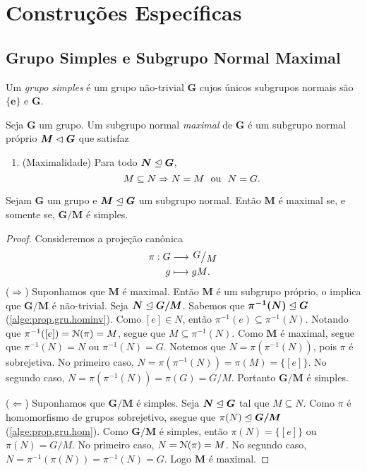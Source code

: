 \cleardoublepage
\section{Construções Específicas}

\subsection{Grupo Simples e Subgrupo Normal Maximal}

\begin{defi}
Um \emph{grupo simples} é um grupo não-trivial $\bm G$ cujos únicos subgrupos normais são $\bm{\{e\}}$ e $\bm G$.
\end{defi}

\begin{defi}
Seja $\bm G$ um grupo. Um subgrupo normal \emph{maximal} de $\bm G$ é um subgrupo normal próprio $\bm M \mathrel{\lhd} \bm G$ que satisfaz
	\begin{enumerate}
	\item (Maximalidade) Para todo $\bm N \mathrel{\unlhd} \bm G$,
		\begin{equation*}
		M \subseteq N \Rightarrow N = M \text{\ \ ou\ \ } N = G.
		\end{equation*}
	\end{enumerate}
\end{defi}

\begin{prop}
Sejam $\bm G$ um grupo e $\bm M \mathrel{\unlhd} \bm G$ um subgrupo normal. Então $\bm M$ é maximal se, e somente se, $\bm{G/M}$ é simples.
\end{prop}
\begin{proof} Consideremos a projeção canônica
	\begin{align*}
	\func{\pi}{G}{\quo{G}{M}}{g}{gM}.
	\end{align*}
($\Rightarrow$) Suponhamos que $\bm M$ é maximal. Então $\bm M$ é um subgrupo próprio, o implica que $\bm{G/M}$ é não-trivial. Seja $\bm N \mathrel{\unlhd} \bm{G/M}$. Sabemos que $\bm{\pi^{-1}(N)} \mathrel{\unlhd} \bm G$ (\ref{alge:prop.gru.hominv}). Como $[e] \in N$, então $\pi^{-1}(e) \subseteq \pi^{-1}(N)$. Notando que $\pi^{-1}([e])=\mathcal{N}(\pi) = M$, segue que $M \subseteq \pi^{-1}(N)$. Como $\bm M$ é maximal, segue que $\pi^{-1}(N) = N$ ou $\pi^{-1}(N) = G$. Notemos que $N=\pi(\pi^{-1}(N))$, pois $\pi$ é sobrejetiva. No primeiro caso, $N = \pi(\pi^{-1}(N)) = \pi(M) = \{[e]\}$. No segundo caso, $N = \pi(\pi^{-1}(N)) = \pi(G) = G/M$. Portanto $\bm{G/M}$ é simples.

\noindent
($\Leftarrow$) Suponhamos que $\bm{G/M}$ é simples. Seja $\bm N \mathrel{\unlhd} \bm G$ tal que $M \subseteq N$. Como $\pi$ é homomorfismo de grupos sobrejetivo, ssegue que $\pi(N) \mathrel{\unlhd} \bm{G/M}$ (\ref{alge:prop.gru.hom}). Como $\bm{G/M}$ é simples, então $\pi(N) = \{[e]\}$ ou $\pi(N) = G/M$. No primeiro caso, $N = \mathcal{N}(\pi) = M$. No segundo caso, $N = \pi^{-1}(\pi(N)) = \pi^{-1}(N) = G$. Logo $\bm M$ é maximal.
\end{proof}

